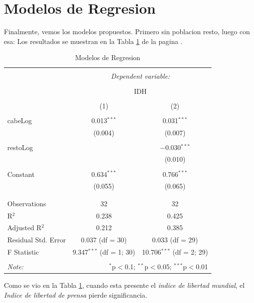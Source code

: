 \section{Modelos de Regresion}

Finalmente, vemos los modelos propuestos. Primero sin poblacion resto, luego con esa: Los resultados se muestran en la Tabla \ref{regresiones} de la pagina \pageref{regresiones}.

  
  
  
\begin{table}[!htbp] \centering 
  \caption{Modelos de Regresion} 
  \label{regresiones} 
\begin{tabular}{@{\extracolsep{5pt}}lcc} 
\\[-1.8ex]\hline 
\hline \\[-1.8ex] 
 & \multicolumn{2}{c}{\textit{Dependent variable:}} \\ 
\cline{2-3} 
\\[-1.8ex] & \multicolumn{2}{c}{IDH} \\ 
\\[-1.8ex] & (1) & (2)\\ 
\hline \\[-1.8ex] 
 cabeLog & 0.013$^{***}$ & 0.031$^{***}$ \\ 
  & (0.004) & (0.007) \\ 
  & & \\ 
 restoLog &  & $-$0.030$^{***}$ \\ 
  &  & (0.010) \\ 
  & & \\ 
 Constant & 0.634$^{***}$ & 0.766$^{***}$ \\ 
  & (0.055) & (0.065) \\ 
  & & \\ 
\hline \\[-1.8ex] 
Observations & 32 & 32 \\ 
R$^{2}$ & 0.238 & 0.425 \\ 
Adjusted R$^{2}$ & 0.212 & 0.385 \\ 
Residual Std. Error & 0.037 (df = 30) & 0.033 (df = 29) \\ 
F Statistic & 9.347$^{***}$ (df = 1; 30) & 10.706$^{***}$ (df = 2; 29) \\ 
\hline 
\hline \\[-1.8ex] 
\textit{Note:}  & \multicolumn{2}{r}{$^{*}$p$<$0.1; $^{**}$p$<$0.05; $^{***}$p$<$0.01} \\ 
\end{tabular} 
\end{table}   
  Como se vio en la Tabla \ref{regresiones}, cuando esta presente el \emph{indice de libertad mundial}, el \emph{Indice de libertad de prensa} pierde significancia.

